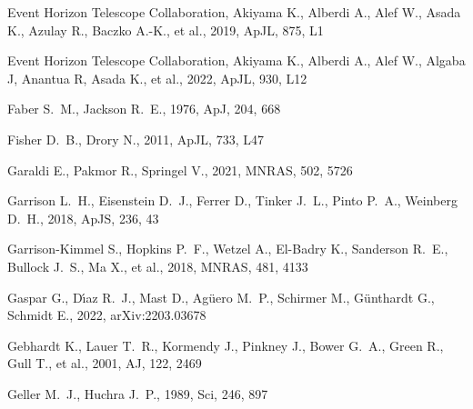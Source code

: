 \documentclass[fleqn,12pt]{article}
\begin{document}
\begin{thebibliography}{}
 Event Horizon Telescope Collaboration, Akiyama K., Alberdi A., Alef W., Asada K., Azulay R., Baczko A.-K., et al., 2019, ApJL, 875, L1

 Event Horizon Telescope Collaboration, Akiyama K., Alberdi A., Alef W., Algaba J, Anantua R, Asada K.,  et al., 2022, ApJL, 930, L12

 Faber S.~M., Jackson R.~E., 1976, ApJ, 204, 668

 Fisher D.~B., Drory N., 2011, ApJL, 733, L47


 Garaldi E., Pakmor R., Springel V., 2021, MNRAS, 502, 5726


 Garrison L.~H., Eisenstein D.~J., Ferrer D., Tinker J.~L., Pinto P.~A., Weinberg D.~H., 2018, ApJS, 236, 43

 Garrison-Kimmel S., Hopkins P.~F., Wetzel A., El-Badry K., Sanderson R.~E., Bullock J.~S., Ma X., et al., 2018, MNRAS, 481, 4133

 Gaspar G., D{\'\i}az R.~J., Mast D., Ag{\"u}ero M.~P., Schirmer M., G{\"u}nthardt G., Schmidt E., 2022, arXiv:2203.03678

 Gebhardt K., Lauer T.~R., Kormendy J., Pinkney J., Bower G.~A., Green R., Gull T., et al., 2001, AJ, 122, 2469

 Geller M.~J., Huchra J.~P., 1989, Sci, 246, 897


\end{thebibliography}
\end{document}
